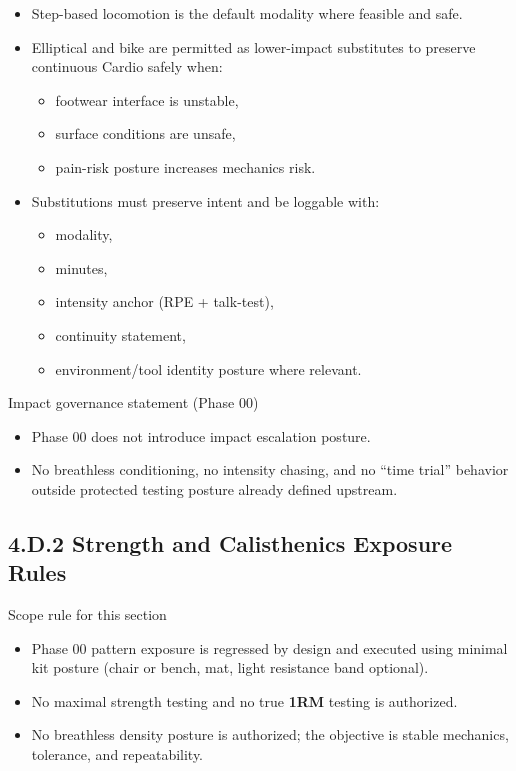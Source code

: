 \documentclass[10pt]{article}
\begin{document}
\begin{itemize}
\item Step-based locomotion is the default modality where feasible and safe.
\item Elliptical and bike are permitted as lower-impact substitutes to preserve continuous Cardio safely when:
  \begin{itemize}
  \item footwear interface is unstable,
  \item surface conditions are unsafe,
  \item pain-risk posture increases mechanics risk.
  \end{itemize}
\item Substitutions must preserve intent and be loggable with:
  \begin{itemize}
  \item modality,
  \item minutes,
  \item intensity anchor (RPE + talk-test),
  \item continuity statement,
  \item environment/tool identity posture where relevant.
  \end{itemize}
\end{itemize}

Impact governance statement (Phase 00)

\begin{itemize}
\item Phase 00 does not introduce impact escalation posture.
\item No breathless conditioning, no intensity chasing, and no “time trial” behavior outside protected testing posture already defined upstream.
\end{itemize}

\subsection*{4.D.2 Strength and Calisthenics Exposure Rules}
{}

Scope rule for this section

\begin{itemize}
\item Phase 00 pattern exposure is regressed by design and executed using minimal kit posture (chair or bench, mat, light resistance band optional).
\item No maximal strength testing and no true \textbf{1RM} testing is authorized.
\item No breathless density posture is authorized; the objective is stable mechanics, tolerance, and repeatability.
\end{itemize}
\end{document}
